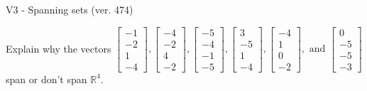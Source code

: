 \begin{exercise}
  \begin{exerciseTitle}V3 - Spanning sets (ver. 474)\end{exerciseTitle}
  \begin{exerciseStatement}
    Explain why the vectors \(\left[\begin{array}{r}
-1 \\
-2 \\
1 \\
-4
\end{array}\right] , \left[\begin{array}{r}
-4 \\
-2 \\
4 \\
-2
\end{array}\right] , \left[\begin{array}{r}
-5 \\
-4 \\
-1 \\
-5
\end{array}\right] , \left[\begin{array}{r}
3 \\
-5 \\
1 \\
-4
\end{array}\right] , \left[\begin{array}{r}
-4 \\
1 \\
0 \\
-2
\end{array}\right] , \text{ and } \left[\begin{array}{r}
0 \\
-5 \\
-5 \\
-3
\end{array}\right]\) span or don't span \(\mathbb{R}^4\). 
	



\end{exerciseStatement}
\end{exercise}
